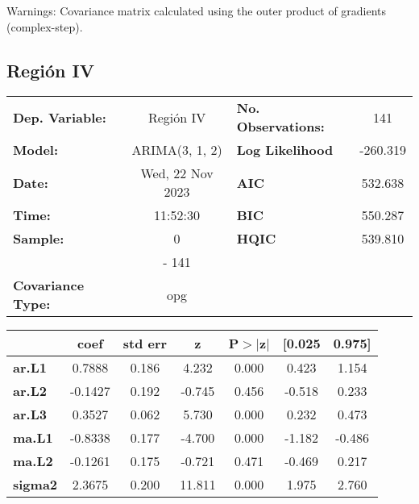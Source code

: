 \documentclass{article}%
\begin{document}
Warnings: \newline
 [1] Covariance matrix calculated using the outer product of gradients (complex-step).%
\subsection*{Región IV}%
\begin{center}
\begin{tabular}{lclc}
\toprule
\textbf{Dep. Variable:}          &    Región IV     & \textbf{  No. Observations:  } &    141      \\
\textbf{Model:}                  &  ARIMA(3, 1, 2)  & \textbf{  Log Likelihood     } &  -260.319   \\
\textbf{Date:}                   & Wed, 22 Nov 2023 & \textbf{  AIC                } &  532.638    \\
\textbf{Time:}                   &     11:52:30     & \textbf{  BIC                } &  550.287    \\
\textbf{Sample:}                 &        0         & \textbf{  HQIC               } &  539.810    \\
\textbf{}                        &       - 141      & \textbf{                     } &             \\
\textbf{Covariance Type:}        &       opg        & \textbf{                     } &             \\
\bottomrule
\end{tabular}
\begin{tabular}{lcccccc}
                & \textbf{coef} & \textbf{std err} & \textbf{z} & \textbf{P$> |$z$|$} & \textbf{[0.025} & \textbf{0.975]}  \\
\midrule
\textbf{ar.L1}  &       0.7888  &        0.186     &     4.232  &         0.000        &        0.423    &        1.154     \\
\textbf{ar.L2}  &      -0.1427  &        0.192     &    -0.745  &         0.456        &       -0.518    &        0.233     \\
\textbf{ar.L3}  &       0.3527  &        0.062     &     5.730  &         0.000        &        0.232    &        0.473     \\
\textbf{ma.L1}  &      -0.8338  &        0.177     &    -4.700  &         0.000        &       -1.182    &       -0.486     \\
\textbf{ma.L2}  &      -0.1261  &        0.175     &    -0.721  &         0.471        &       -0.469    &        0.217     \\
\textbf{sigma2} &       2.3675  &        0.200     &    11.811  &         0.000        &        1.975    &        2.760     \\

\end{tabular}
\end{center}
\end{document}
